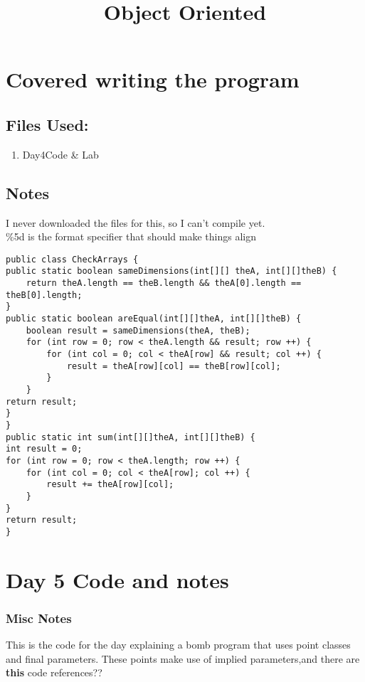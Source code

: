 \documentclass{article}
\begin{document}
\title{Object Oriented}
\maketitle

\section{Covered writing the program }

\subsection{Files Used:}

\begin{enumerate}
\item{Day4Code \& Lab} 
\end{enumerate}

\subsection{Notes}
I never downloaded the files for this, so I can't compile yet. \\
\%5d is the format specifier that should make things align

\begin{lstlisting}
public class CheckArrays {
public static boolean sameDimensions(int[][] theA, int[][]theB) {
    return theA.length == theB.length && theA[0].length == theB[0].length;
}
public static boolean areEqual(int[][]theA, int[][]theB) {
    boolean result = sameDimensions(theA, theB);
    for (int row = 0; row < theA.length && result; row ++) {
        for (int col = 0; col < theA[row] && result; col ++) {
            result = theA[row][col] == theB[row][col];
        }
    }
return result;
}
}
public static int sum(int[][]theA, int[][]theB) {
int result = 0;
for (int row = 0; row < theA.length; row ++) {
    for (int col = 0; col < theA[row]; col ++) {
        result += theA[row][col];
    }
}
return result;
}
\end{lstlisting}

\section{Day 5 Code and notes}
\subsubsection{ Misc Notes}
This is the code for the day explaining a bomb program that uses point classes and final parameters. These points make use of implied parameters,and there are \textbf{this} code references?? \\
\end{document}
